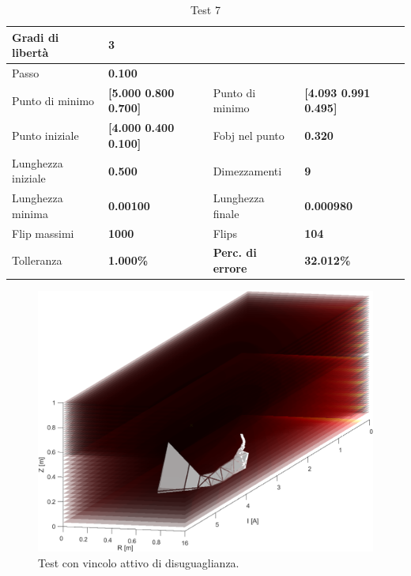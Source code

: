 \documentclass[a4paper, 11pt]{article}
\begin{document}
\begin{table}[h]
    \caption{Test 7}
    \begin{center}
    \begin{tabular}{|l|l|l|l|} 
    \hline 
Gradi di libertà & \textbf{3} &  &  \\ \hline 
Passo & \textbf{0.100} &  &  \\ \hline 
Punto di minimo & \textbf{{[}5.000 0.800 0.700{]}} & Punto di minimo &
\textbf{{[}4.093 0.991 0.495{]}} \\ \hline 
Punto iniziale & \textbf{{[}4.000 0.400 0.100{]}} & Fobj nel punto &
\textbf{0.320} \\ \hline 
Lunghezza iniziale & \textbf{0.500} & Dimezzamenti & \textbf{9} \\ \hline 
Lunghezza minima & \textbf{0.00100} & Lunghezza finale & \textbf{0.000980} \\
\hline
Flip massimi & \textbf{1000} & Flips & \textbf{104} \\ \hline 
Tolleranza & \textbf{1.000\%} & \textbf{Perc. di errore} & \textbf{32.012\%} \\
\hline 
    \end{tabular} 
    \end{center}
    \end{table}

\begin{figure}[H]
    \centering
        \includegraphics[width=14cm]{assets/figure7}
        \caption{Test con vincolo attivo di disuguaglianza.}
\end{figure}
\noindent
\end{document}
